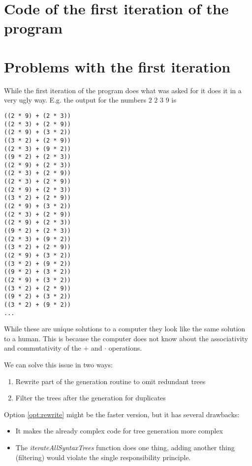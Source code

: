 \documentclass[11pt,a4paper]{article}
\begin{document}
\section{Code of the first iteration of the program}



\section{Problems with the first iteration}

While the first iteration of the program does what was asked for it
does it in a very ugly way. E.g. the output for the numbers $2$ $2$ $3$ $9$
is
\begin{verbatim}
((2 * 9) + (2 * 3))
((2 * 3) + (2 * 9))
((2 * 9) + (3 * 2))
((3 * 2) + (2 * 9))
((2 * 3) + (9 * 2))
((9 * 2) + (2 * 3))
((2 * 9) + (2 * 3))
((2 * 3) + (2 * 9))
((2 * 3) + (2 * 9))
((2 * 9) + (2 * 3))
((3 * 2) + (2 * 9))
((2 * 9) + (3 * 2))
((2 * 3) + (2 * 9))
((2 * 9) + (2 * 3))
((9 * 2) + (2 * 3))
((2 * 3) + (9 * 2))
((3 * 2) + (2 * 9))
((2 * 9) + (3 * 2))
((3 * 2) + (9 * 2))
((9 * 2) + (3 * 2))
((2 * 9) + (3 * 2))
((3 * 2) + (2 * 9))
((9 * 2) + (3 * 2))
((3 * 2) + (9 * 2))
...
\end{verbatim}

While these are unique solutions to a computer they look like the same
solution to a human. This is because the computer does not know about
the associativity and commutativity of the $+$ and $\cdot$
operations.

We can solve this issue in two ways:
\begin{enumerate}
\item \label{opt:rewrite} Rewrite part of the generation routine to
  omit redundant trees
\item \label{opt:filter} Filter the trees after the generation for
  duplicates
\end{enumerate}

Option \ref{opt:rewrite} might be the faster version, but it has
several drawbacks:
\begin{itemize}
\item It makes the already complex code for tree generation more
  complex
\item The \textit{iterateAllSyntaxTrees} function does one thing,
  adding another thing (filtering) would violate the single
  responsibility principle.
\end{itemize}
\end{document}
